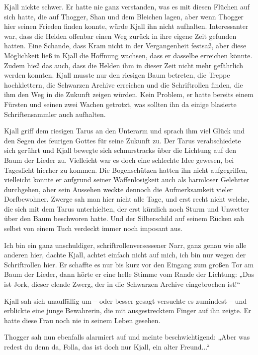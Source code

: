 Kjall nickte schwer. Er hatte nie ganz verstanden, was es mit diesen Flüchen auf sich hatte, die auf Thogger, Shan und dem Bleichen lagen, aber wenn Thogger hier seinen Frieden finden konnte, würde Kjall ihn nicht aufhalten. Interessanter war, dass die Helden offenbar einen Weg zurück in ihre eigene Zeit gefunden hatten. Eine Schande, dass Kram nicht in der Vergangenheit festsaß, aber diese Möglichkeit ließ in Kjall die Hoffnung wachsen, dass er dasselbe erreichen könnte. Zudem hieß das auch, dass die Helden ihm in dieser Zeit nicht mehr gefährlich werden konnten. Kjall musste nur den riesigen Baum betreten, die Treppe hochklettern, die Schwarzen Archive erreichen und die Schriftrollen finden, die ihm den Weg in die Zukunft zeigen würden. Kein Problem, er hatte bereits einem Fürsten und seinen zwei Wachen getrotzt, was sollten ihn da einige blasierte Schriftensammler auch aufhalten.

Kjall griff dem riesigen Tarus an den Unterarm und sprach ihm viel Glück und den Segen des feurigen Gottes für seine Zukunft zu. Der Tarus verabschiedete sich gerührt und Kjall bewegte sich schnurstracks über die Lichtung auf den Baum der Lieder zu. Vielleicht war es doch eine schlechte Idee gewesen, bei Tageslicht hierher zu kommen. Die Bogenschützen hatten ihn nicht aufgegriffen, vielleicht konnte er aufgrund seiner Waffenlosigkeit auch als harmloser Gelehrter durchgehen, aber sein Aussehen weckte dennoch die Aufmerksamkeit vieler Dorfbewohner. Zwerge sah man hier nicht alle Tage, und erst recht nicht welche, die sich mit dem Tarus unterhielten, der erst kürzlich noch Sturm und Unwetter über den Baum beschworen hatte. Und der Silberschild auf seinem Rücken sah selbst von einem Tuch verdeckt immer noch imposant aus.

Ich bin ein ganz unschuldiger, schriftrollenversessener Narr, ganz genau wie alle anderen hier, dachte Kjall, achtet einfach nicht auf mich, ich bin nur wegen der Schriftrollen hier. Er schaffte es nur bis kurz vor den Eingang zum großen Tor am Baum der Lieder, dann hörte er eine helle Stimme vom Rande der Lichtung: „Das ist Jork, dieser elende Zwerg, der in die Schwarzen Archive eingebrochen ist!“

Kjall sah sich unauffällig um – oder besser gesagt versuchte es zumindest – und erblickte eine junge Bewahrerin, die mit ausgestrecktem Finger auf ihn zeigte. Er hatte diese Frau noch nie in seinem Leben gesehen.

Thogger sah nun ebenfalls alarmiert auf und meinte beschwichtigend: „Aber was redest du denn da, Folla, das ist doch nur Kjall, ein alter Freund...“


